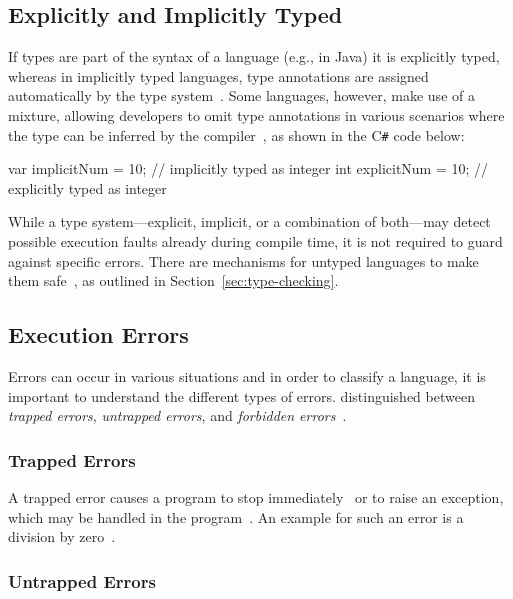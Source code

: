 \subsection{Explicitly and Implicitly Typed}
\label{sec:explicitly-implicitly-typed}

If types are part of the syntax of a language (e.g., in Java) it is explicitly typed, whereas in implicitly typed languages, type annotations are assigned automatically by the type system~\cite[pp.~2--3]{TypeSystems:Cardelli:2004}. Some languages, however, make use of a mixture, allowing developers to omit type annotations in various scenarios where the type can be inferred by the compiler~\cite[p.~10]{TypesAndProgrammingLanguages:Pierce:2002}, as shown in the C\texttt{\#} code below:
\begin{CsCode}[numbers=none]
var implicitNum = 10; // implicitly typed as integer
int explicitNum = 10; // explicitly typed as integer
\end{CsCode}
While a type system---explicit, implicit, or a combination of both---may detect possible execution faults already during compile time, it is not required to guard against specific errors. There are mechanisms for untyped languages to make them safe~\cite[p.~3]{TypeSystems:Cardelli:2004}, as outlined in Section~\ref{sec:type-checking}.

\subsection{Execution Errors}
\label{sec:execution-errors}

Errors can occur in various situations and in order to classify a language, it is important to understand the different types of errors. \citeauthor{TypeSystems:Cardelli:2004} distinguished between \emph{trapped errors}, \emph{untrapped errors}, and \emph{forbidden errors}~\cite[p.~3]{TypeSystems:Cardelli:2004}.

\subsubsection{Trapped Errors}

A trapped error causes a program to stop immediately~\cite[p.~3]{TypeSystems:Cardelli:2004} or to raise an exception, which may be handled in the program~\cite[p.~7]{TypesAndProgrammingLanguages:Pierce:2002}. An example for such an error is a division by zero~\cite[p.~3]{TypeSystems:Cardelli:2004}.

\subsubsection{Untrapped Errors}

